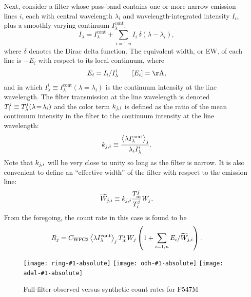 \documentclass[preprint, 12pt]{aastex}
\begin{document}
Next, consider a filter whose pass-band contains 
one or more narrow emission lines \(i\), 
each with central wavelength \(\lambda_i\) 
and wavelength-integrated intensity \(I_i\),
plus a smoothly varying continuum \(I_\lambda^{\mathrm{cont}}\):
\begin{equation}
  \label{eq:line-plus-cont}
  I_\lambda = I_\lambda^{\mathrm{cont}} + 
  \sum_{i=1, n} I_i\, \delta(\lambda - \lambda_i)  ,
\end{equation}
where \(\delta\) denotes the Dirac delta function.
The equivalent width, or EW, of each line is
\(-E_i\) with respect to its local continuum, where
\begin{equation}
  \label{eq:EW}
  E_i = I_i / I_\lambda^i \quad\quad [E_i] = \U{\AA}, 
\end{equation}
and in which \(I_\lambda^i \equiv I_\lambda^{\mathrm{cont}} (\lambda \!=\!
\lambda_i)\) is the continuum intensity at the line wavelength.  
The filter transmission at the line wavelength is denoted 
\(T_{i}^{j} \equiv T_{\lambda}^{j}(\lambda\!=\!\lambda_i)\)
and the color term \(k_{j, i}\) is defined as 
the ratio of the mean continuum intensity in the filter to the
continuum intensity at the line wavelength:
\begin{equation}
  \label{eq:line-color}
  k_{j, i} \equiv \frac{\bigl\langle \lambda I_\lambda^{\mathrm{cont}} \bigr\rangle_{j}}{\lambda_i I_\lambda^i} . 
\end{equation}
Note that \(k_{j, i}\) will be very close to unity so long as the
filter is narrow.  
It is also convenient to define an ``effective width'' of the filter 
with respect to the emission line: 
\begin{equation}
  \label{eq:effective}
  \widetilde{W}_{j, i} \equiv k_{j, i} \frac{T_{\mathrm{m}}^{j}}{T_{i}^{j}} W_j .
\end{equation}
From the foregoing, the count rate in this case is found to be
\begin{equation}
  \label{eq:R-line-plus-cont}
  R_j 
  = C_{\mathrm{WFC3}}\, \bigl\langle \lambda I_\lambda^{\mathrm{cont}} \bigr\rangle_{j} \, T_{\mathrm{m}}^{j} W_j 
  \left(
     1 + \sum_{i=1,n} E_i / \widetilde{W}_{j, i}
  \right) 
  .
\end{equation}

\newcommand\multicorrel[2]{
    \texttt{[image: ring-\#1-absolute]}%
    \texttt{[image: odh-\#1-absolute]}%
    \texttt{[image: adal-\#1-absolute]}%
}

\begin{figure}[p]
  \centering
  \multicorrel{F547M}{green}
  \caption{Full-filter observed versus synthetic count rates for F547M}
  \label{fig:multicorrel-continuum}
\end{figure}
\end{document}
